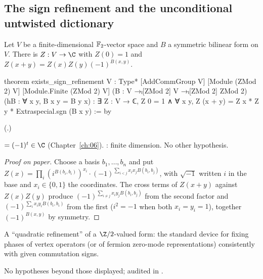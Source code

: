 \subsection{The sign refinement and the unconditional untwisted dictionary}

\begin{theorem}\label{ch21:thm:signref}
Let $V$ be a finite-dimensional $\mathbb{F}_2$-vector space and $B$ a symmetric bilinear form on $V$.  There is
$Z:V\to\C$ with $Z(0)=1$ and $Z(x+y)=Z(x)Z(y)(-1)^{B(x,y)}$.
\end{theorem}
\begin{leancode}
theorem exists_sign_refinement {V : Type*} [AddCommGroup V] [Module (ZMod 2) V]
    [Module.Finite (ZMod 2) V] (B : V →ₗ[ZMod 2] V →ₗ[ZMod 2] ZMod 2)
    (hB : ∀ x y, B x y = B y x) :
    ∃ Z : V → ℂ, Z 0 = 1 ∧ ∀ x y, Z (x + y) = Z x * Z y * Extraspecial.sgn (B x y) := by
\end{leancode}
(.)
\begin{dictionary}
 $=(-1)^t\in\C$ (Chapter~\ref{ch:06}).  :
finite dimension.  No other hypothesis.
\end{dictionary}
\begin{proof}[Proof on paper]
Choose a basis $b_1,\dots,b_n$ and put
$Z(x)=\prod_i(i^{B(b_i,b_i)})^{x_i}\cdot(-1)^{\sum_{i<j}x_ix_jB(b_i,b_j)}$, with $\sqrt{-1}$ written $i$
in the base and $x_i\in\{0,1\}$ the coordinates.  The cross terms of $Z(x+y)$ against $Z(x)Z(y)$ produce
$(-1)^{\sum_{i\ne j}x_iy_jB(b_i,b_j)}$ from the second factor and $(-1)^{\sum_ix_iy_iB(b_i,b_i)}$ from
the first ($i^{2}=-1$ when both $x_i=y_i=1$), together $(-1)^{B(x,y)}$ by symmetry.
\end{proof}
\begin{physics}
A ``quadratic refinement'' of a $\Z/2$-valued form: the standard device for fixing phases of vertex
operators (or of fermion zero-mode representations) consistently with given commutation signs.
\end{physics}
\begin{status}
No hypotheses beyond those displayed; audited in .
\end{status}

